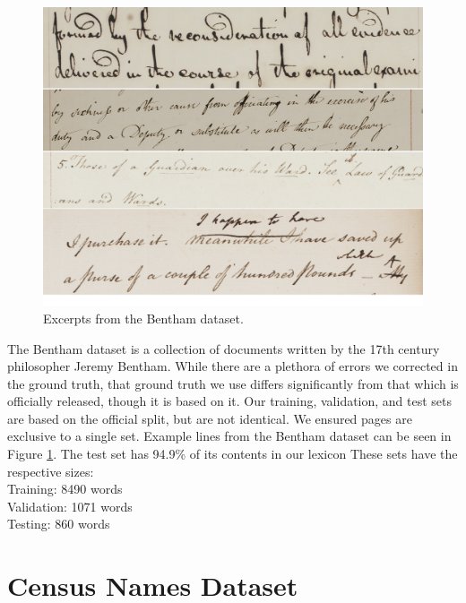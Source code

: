 \documentclass[ms,electronic,twosidetoc,letterpaper,chaptercenter,parttop,lof,lot]{byumsphd}
\begin{document}
\begin{figure}
    \centering
    \includegraphics[width=.9\textwidth]{bentham_examples}
    \caption{Excerpts from the Bentham dataset.}
    \label{fig:BenthamExamples}
\end{figure}

The Bentham dataset \cite{bentham} is a collection of documents written by the 17th century philosopher Jeremy Bentham. While there are a plethora of errors we corrected in the ground truth, that ground truth we use differs significantly from that which is officially released, though it is based on it. 
Our training, validation, and test sets are based on the official split, but are not identical.
We ensured pages are exclusive to a single set.
Example lines from the Bentham dataset can be seen in Figure \ref{fig:BenthamExamples}.
The test set has 94.9\% of its contents in our lexicon
These sets have the respective sizes:\\
\indent \indent Training: 8490 words\\
\indent \indent Validation: 1071 words\\
\indent \indent Testing: 860 words



\section{Census Names Dataset}
\end{document}
